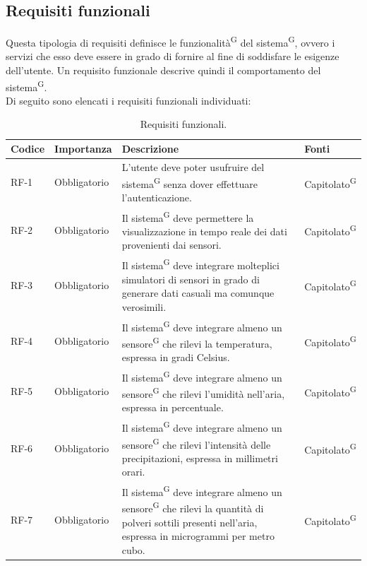 \documentclass[8pt]{article}
\newcommand{\glossterm}[1]{#1\textsuperscript{G}} %
\begin{document}
\subsection{Requisiti funzionali}
Questa tipologia di requisiti definisce le \glossterm{funzionalità} del \glossterm{sistema}, ovvero i servizi che esso deve essere in grado di fornire al fine di soddisfare le esigenze dell'utente. Un requisito funzionale descrive quindi il comportamento del \glossterm{sistema}. \\ Di seguito sono elencati i requisiti funzionali individuati:
\renewcommand{\arraystretch}{2.5}
\begin{longtable}{|>{\centering\arraybackslash}p{1.2cm}|>{\centering\arraybackslash}p{2cm}|>{\centering\arraybackslash}p{8.5cm}|>{\centering\arraybackslash}p{3cm}|}
    \hline
    \rowcolor{white}
	\textbf{Codice} & \textbf{Importanza} & \textbf{Descrizione} & \textbf{Fonti}\\ \hline
 \endfirsthead
 \rowcolor{white}
    \caption{Requisiti funzionali.}
	\label{table:Requisiti funzionali}
 \endlastfoot
            RF-1 & Obbligatorio & L'utente deve poter usufruire del \glossterm{sistema} senza dover effettuare l'autenticazione. & \glossterm{Capitolato} \\ \hline
            RF-2 & Obbligatorio & Il \glossterm{sistema} deve permettere la visualizzazione in tempo reale dei dati provenienti dai sensori. & \glossterm{Capitolato} \\ \hline
            RF-3 & Obbligatorio & Il \glossterm{sistema} deve integrare molteplici simulatori di sensori in grado di generare dati casuali ma comunque verosimili. & \glossterm{Capitolato} \\ \hline
            RF-4 & Obbligatorio & Il \glossterm{sistema} deve integrare almeno un \glossterm{sensore} che rilevi la temperatura, espressa in gradi Celsius. & \glossterm{Capitolato} \\ \hline
            RF-5 & Obbligatorio & Il \glossterm{sistema} deve integrare almeno un \glossterm{sensore} che rilevi l'umidità nell'aria, espressa in percentuale. & \glossterm{Capitolato} \\ \hline
            RF-6 & Obbligatorio & Il \glossterm{sistema} deve integrare almeno un \glossterm{sensore} che rilevi l'intensità delle precipitazioni, espressa in millimetri orari. & \glossterm{Capitolato} \\ \hline
            RF-7 & Obbligatorio & Il \glossterm{sistema} deve integrare almeno un \glossterm{sensore} che rilevi la quantità di polveri sottili presenti nell'aria, espressa in microgrammi per metro cubo. & \glossterm{Capitolato} \\ \hline

\end{longtable}
\end{document}
